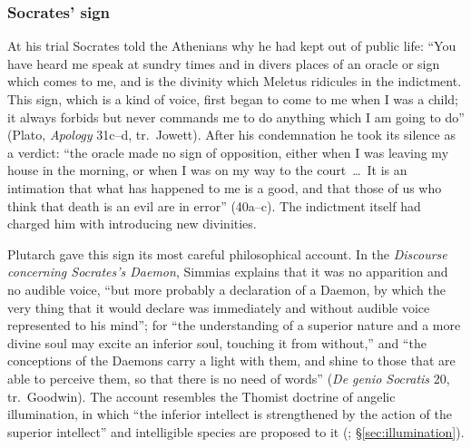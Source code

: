 \subsubsection{Socrates' sign}\label{sec:bc-socrates}

At his trial Socrates told the Athenians why he had kept out of public
life: ``You have heard me speak at sundry times and in divers places of
an oracle or sign which comes to me, and is the divinity which Meletus
ridicules in the indictment. This sign, which is a kind of voice, first
began to come to me when I was a child; it always forbids but never
commands me to do anything which I am going to do'' (Plato,
\emph{Apology} 31c--d, tr.\ Jowett). After his condemnation he took its
silence as a verdict: ``the oracle made no sign of opposition, either
when I was leaving my house in the morning, or when I was on my way to
the court~\dots\ It is an intimation that what has happened to me is a
good, and that those of us who think that death is an evil are in
error'' (40a--c). The indictment itself had charged him with introducing
new divinities.

Plutarch gave this sign its most careful philosophical account. In the
\emph{Discourse concerning Socrates's Daemon}, Simmias explains that it
was no apparition and no audible voice, ``but more probably a
declaration of a Daemon, by which the very thing that it would declare
was immediately and without audible voice represented to his mind''; for
``the understanding of a superior nature and a more divine soul may
excite an inferior soul, touching it from without,'' and ``the
conceptions of the Daemons carry a light with them, and shine to those
that are able to perceive them, so that there is no need of words''
(\emph{De genio Socratis} 20, tr.\ Goodwin). The account resembles
the Thomist doctrine of angelic illumination, in which ``the inferior
intellect is strengthened by the action of the superior intellect'' and
intelligible species are proposed to it (;
\S\ref{sec:illumination}).

